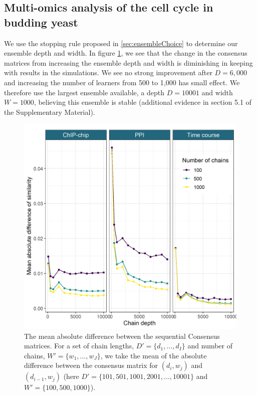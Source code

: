 \documentclass{bmcart}
\begin{document}
	\subsection*{Multi-omics analysis of the cell cycle in budding yeast}
	We use the stopping rule proposed in \ref{sec:ensembleChoice} to determine our ensemble depth and width. In figure \ref{fig:ensembleChoice}, we see that the change in the consensus matrices from increasing the ensemble depth and width is diminishing in keeping with results in the simulations. We see no strong improvement after $D=6,000$ and increasing the number of learners from 500 to 1,000 has small effect. We therefore use the largest ensemble available, a depth $D=10001$ and width $W=1000$, believing this ensemble is stable (additional evidence in section 5.1 of the Supplementary Material).
	
	\begin{figure}
		\centering
		\includegraphics[scale=0.7]{./Images/Yeast/EnsembleChoicePlotAlt.png}
		\caption{The mean absolute difference between the sequential Consensus matrices. For a set of chain lengths, $D'=\{d_1, \ldots, d_I\}$ and number of chains, $W'=\{w_1, \ldots, w_J\}$, we take the mean of the absolute difference between the consensus matrix for $(d_i, w_j)$ and $(d_{i-1}, w_{j})$ (here $D'=\{101, 501, 1001, 2001, \ldots, 10001\}$ and $W'=\{100, 500, 1000\}$). 
		}
		\label{fig:ensembleChoice}
	\end{figure}
	
\end{document}
